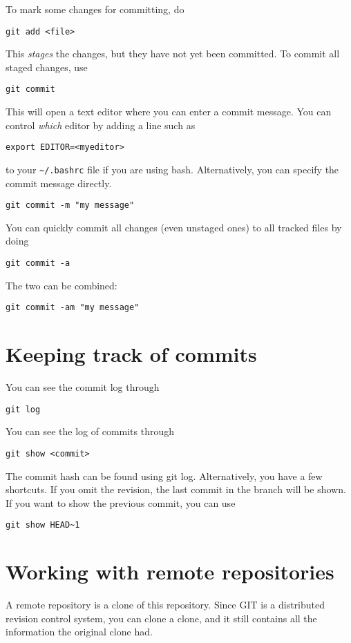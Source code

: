 To mark some changes for committing, do
\begin{lstlisting}[style=shell]
  git add <file>
\end{lstlisting}
This \emph{stages} the changes, but they have not yet been committed. To commit
all staged changes, use
\begin{lstlisting}[style=shell]
  git commit
\end{lstlisting}
This will open a text editor where you can enter a commit message. You can
control \emph{which} editor by adding a line such as
\begin{lstlisting}[style=shell]
  export EDITOR=<myeditor>
\end{lstlisting}
to your \texttt{\textasciitilde/.bashrc} file if you are using bash.
Alternatively, you can specify the commit message directly.
\begin{lstlisting}[style=shell]
  git commit -m "my message"
\end{lstlisting}
You can quickly commit all changes (even unstaged ones) to all tracked files by
doing
\begin{lstlisting}[style=shell]
  git commit -a
\end{lstlisting}
The two can be combined:
\begin{lstlisting}[style=shell]
  git commit -am "my message"
\end{lstlisting}

\section{Keeping track of commits}
You can see the commit log through
\begin{lstlisting}[style=shell]
  git log
\end{lstlisting}
You can see the log of commits through
\begin{lstlisting}[style=shell]
  git show <commit>
\end{lstlisting}
The commit hash can be found using git log. Alternatively, you have a few
shortcuts. If you omit the revision, the last commit in the branch will be
shown. If you want to show the previous commit, you can use
\begin{lstlisting}[style=shell]
  git show HEAD~1
\end{lstlisting}

\section{Working with remote repositories}
A remote repository is a clone of this repository. Since GIT is a distributed
revision control system, you can clone a clone, and it still contains all the
information the original clone had.


